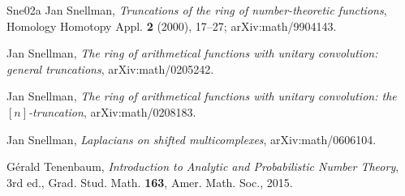 \documentclass[a4paper,11pt,oneside,reqno]{amsart}
\theoremstyle{definition}
\theoremstyle{remark}
\theoremstyle{plain}
\begin{document}
\begin{thebibliography}{Sne02a}
Jan Snellman,
\emph{Truncations of the ring of number-theoretic functions},
Homology Homotopy Appl. \textbf{2} (2000), 17--27; arXiv:math/9904143.

Jan Snellman,
\emph{The ring of arithmetical functions with unitary convolution: general
truncations},
arXiv:math/0205242.

Jan Snellman,
\emph{The ring of arithmetical functions with unitary convolution: the
\([n]\)-truncation},
arXiv:math/0208183.

Jan Snellman,
\emph{Laplacians on shifted multicomplexes},
arXiv:math/0606104.

Gérald Tenenbaum,
\emph{Introduction to Analytic and Probabilistic Number Theory},
3rd ed., Grad. Stud. Math. \textbf{163}, Amer. Math. Soc., 2015.

\end{thebibliography}
\end{document}
